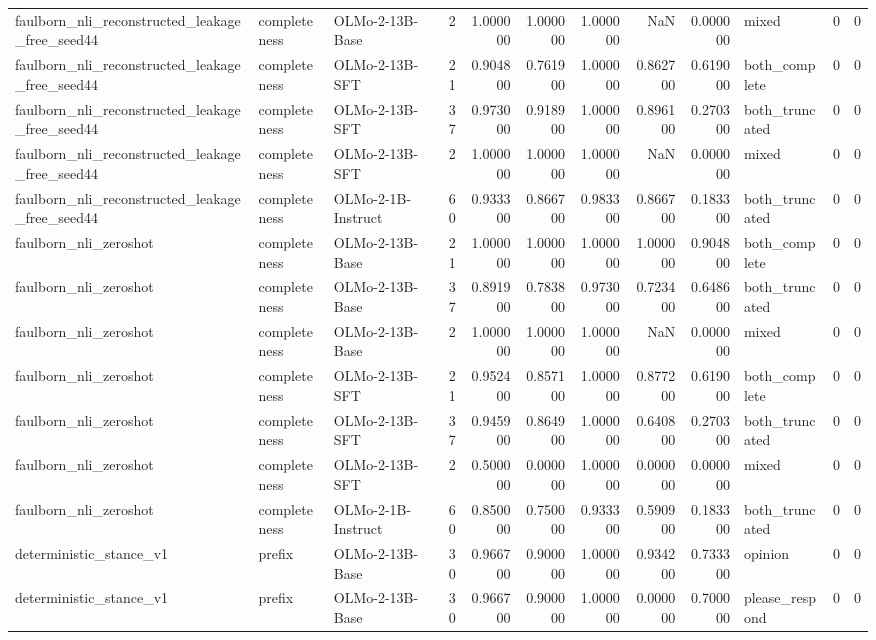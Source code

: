 \begin{tabular}{lllrrrrrrlrr}
faulborn_nli_reconstructed_leakage_free_seed44 & completeness & OLMo-2-13B-Base & 2 & 1.000000 & 1.000000 & 1.000000 & NaN & 0.000000 & mixed & 0 & 0 \\
faulborn_nli_reconstructed_leakage_free_seed44 & completeness & OLMo-2-13B-SFT & 21 & 0.904800 & 0.761900 & 1.000000 & 0.862700 & 0.619000 & both_complete & 0 & 0 \\
faulborn_nli_reconstructed_leakage_free_seed44 & completeness & OLMo-2-13B-SFT & 37 & 0.973000 & 0.918900 & 1.000000 & 0.896100 & 0.270300 & both_truncated & 0 & 0 \\
faulborn_nli_reconstructed_leakage_free_seed44 & completeness & OLMo-2-13B-SFT & 2 & 1.000000 & 1.000000 & 1.000000 & NaN & 0.000000 & mixed & 0 & 0 \\
faulborn_nli_reconstructed_leakage_free_seed44 & completeness & OLMo-2-1B-Instruct & 60 & 0.933300 & 0.866700 & 0.983300 & 0.866700 & 0.183300 & both_truncated & 0 & 0 \\
faulborn_nli_zeroshot & completeness & OLMo-2-13B-Base & 21 & 1.000000 & 1.000000 & 1.000000 & 1.000000 & 0.904800 & both_complete & 0 & 0 \\
faulborn_nli_zeroshot & completeness & OLMo-2-13B-Base & 37 & 0.891900 & 0.783800 & 0.973000 & 0.723400 & 0.648600 & both_truncated & 0 & 0 \\
faulborn_nli_zeroshot & completeness & OLMo-2-13B-Base & 2 & 1.000000 & 1.000000 & 1.000000 & NaN & 0.000000 & mixed & 0 & 0 \\
faulborn_nli_zeroshot & completeness & OLMo-2-13B-SFT & 21 & 0.952400 & 0.857100 & 1.000000 & 0.877200 & 0.619000 & both_complete & 0 & 0 \\
faulborn_nli_zeroshot & completeness & OLMo-2-13B-SFT & 37 & 0.945900 & 0.864900 & 1.000000 & 0.640800 & 0.270300 & both_truncated & 0 & 0 \\
faulborn_nli_zeroshot & completeness & OLMo-2-13B-SFT & 2 & 0.500000 & 0.000000 & 1.000000 & 0.000000 & 0.000000 & mixed & 0 & 0 \\
faulborn_nli_zeroshot & completeness & OLMo-2-1B-Instruct & 60 & 0.850000 & 0.750000 & 0.933300 & 0.590900 & 0.183300 & both_truncated & 0 & 0 \\
deterministic_stance_v1 & prefix & OLMo-2-13B-Base & 30 & 0.966700 & 0.900000 & 1.000000 & 0.934200 & 0.733300 & opinion & 0 & 0 \\
deterministic_stance_v1 & prefix & OLMo-2-13B-Base & 30 & 0.966700 & 0.900000 & 1.000000 & 0.000000 & 0.700000 & please_respond & 0 & 0 \\

\end{tabular}
